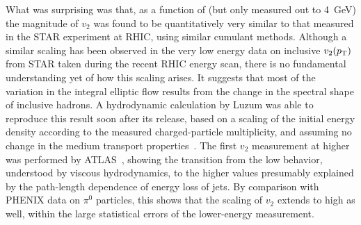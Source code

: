 What was surprising was that, as a function of \pT (but only measured out to 4~GeV)
the magnitude of $v_2$ was found to be quantitatively very similar to that measured in
the STAR experiment at RHIC, using similar cumulant methods.
Although a similar scaling has been observed in the very low energy
data on inclusive $v_2(\mbox{$p_{\mathrm{T}}$})$ from STAR taken during the recent RHIC energy scan,
there is no fundamental understanding yet of how this scaling arises.
It suggests that most of the variation in the integral elliptic flow results from the change in the spectral shape
of inclusive hadrons.
A hydrodynamic calculation by Luzum was able to reproduce this result soon after its release,
based on a scaling of the initial energy density according to the measured charged-particle
multiplicity, and assuming no change in the medium transport properties~\cite{Luzum:2010ag}.
The first $v_2$ measurement at higher \pT was performed by ATLAS~\cite{ATLAS:2011ah},
showing the transition from the low \pT behavior,
understood by viscous hydrodynamics, to the higher \pT values presumably explained by the path-length dependence of
energy loss of jets.
By comparison with PHENIX data on $\pi^0$ particles, this shows that the scaling of $v_2$ extends to high \pT as well,
within the large statistical errors of the lower-energy measurement.

